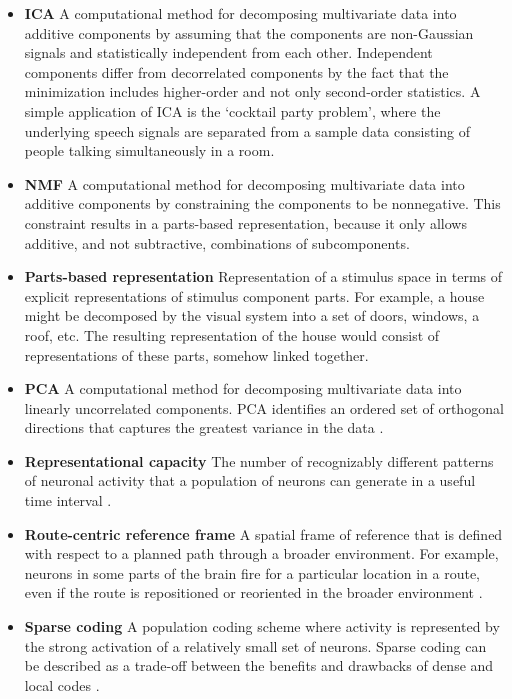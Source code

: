 \begin{itemize}
\item \textbf{\Acf{ICA}} A computational method for decomposing multivariate data into additive components by assuming that the components are non-Gaussian signals and statistically independent from each other. Independent components differ from decorrelated components by the fact that the minimization includes higher-order and not only second-order statistics. A simple application of \ac{ICA} is the `cocktail party problem', where the underlying speech signals are separated from a sample data consisting of people talking simultaneously in a room.

\item \textbf{\Acf{NMF}} A computational method for decomposing multivariate data into additive components by constraining the components to be nonnegative. This constraint results in a parts-based representation, because it only allows additive, and not subtractive, combinations of subcomponents.

\item \textbf{Parts-based representation} Representation of a stimulus space
in terms of explicit representations of stimulus component parts.
For example, a house might be decomposed by the visual system into a set of doors,
windows, a roof, etc. The resulting representation of the house would consist of
representations of these parts, somehow linked together.

\item \textbf{\Acf{PCA}} A computational method for decomposing multivariate data into linearly uncorrelated components. \Ac{PCA} identifies an ordered set of orthogonal directions that captures the greatest variance in the data \cite{CunninghamYu2014}.

\item \textbf{Representational capacity} The number of recognizably different patterns of neuronal activity that a population of neurons can generate in a useful time interval \cite{Laughlin2001}.

\item \textbf{Route-centric reference frame} A spatial frame of reference that is defined with respect to a planned path through a broader environment. For example, neurons in some parts of the brain fire for a particular location in a route, even if the route is repositioned or reoriented in the broader environment \cite{nitz2009parietal}.

\item \textbf{Sparse coding} A population coding scheme where activity is represented by the strong activation of a relatively small set of neurons. Sparse coding can be described as a trade-off between the benefits and drawbacks of dense and local codes \cite{Foldiak1990}.


\end{itemize}
